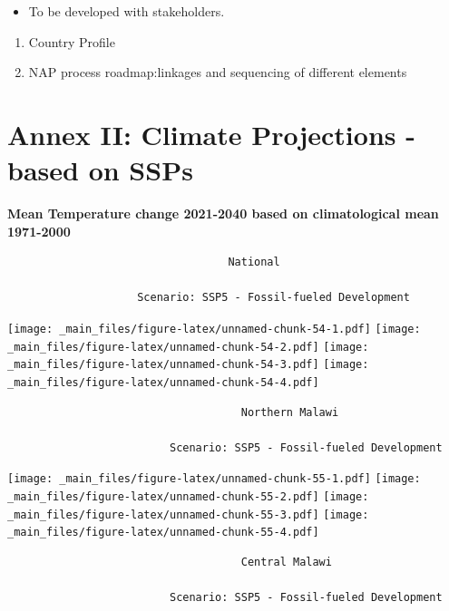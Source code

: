 \documentclass[
]{book}
\providecommand{\tightlist}{%
  \setlength{\itemsep}{0pt}\setlength{\parskip}{0pt}}
\begin{document}
\begin{itemize}
\tightlist
\item
  To be developed with stakeholders.
\end{itemize}

\begin{enumerate}
\def\labelenumi{\arabic{enumi}.}
\item
  Country Profile
\item
  NAP process roadmap:linkages and sequencing of different elements
\end{enumerate}

\hypertarget{annex-ii-climate-projections---based-on-ssps}{%
\chapter*{Annex II: Climate Projections - based on SSPs}\label{annex-ii-climate-projections---based-on-ssps}}

\textbf{Mean Temperature change 2021-2040 based on climatological mean 1971-2000}

\begin{verbatim}
                                  National
                                  
                    Scenario: SSP5 - Fossil-fueled Development
\end{verbatim}

\texttt{[image: \_main\_files/figure-latex/unnamed-chunk-54-1.pdf]} \texttt{[image: \_main\_files/figure-latex/unnamed-chunk-54-2.pdf]} \texttt{[image: \_main\_files/figure-latex/unnamed-chunk-54-3.pdf]} \texttt{[image: \_main\_files/figure-latex/unnamed-chunk-54-4.pdf]}

\begin{verbatim}
                                    Northern Malawi
                                    
                         Scenario: SSP5 - Fossil-fueled Development
\end{verbatim}

\texttt{[image: \_main\_files/figure-latex/unnamed-chunk-55-1.pdf]} \texttt{[image: \_main\_files/figure-latex/unnamed-chunk-55-2.pdf]} \texttt{[image: \_main\_files/figure-latex/unnamed-chunk-55-3.pdf]} \texttt{[image: \_main\_files/figure-latex/unnamed-chunk-55-4.pdf]}

\begin{verbatim}
                                    Central Malawi
                                    
                         Scenario: SSP5 - Fossil-fueled Development
\end{verbatim}
\end{document}
